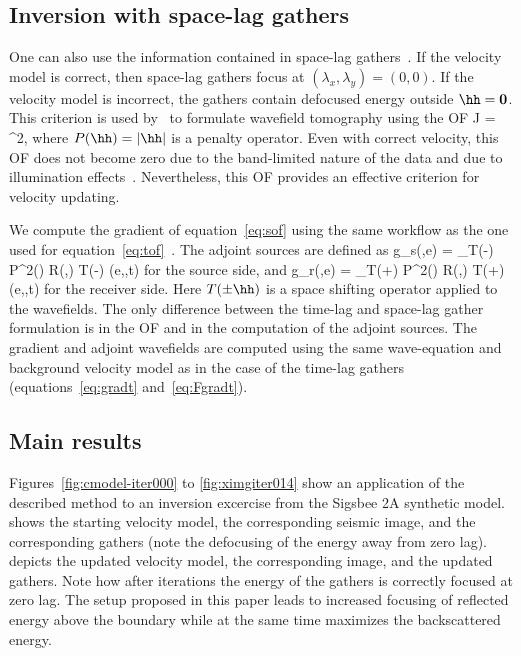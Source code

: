 \subsection{Inversion with space-lag gathers}
One can also use the information contained in space-lag 
gathers~\citep{rickett:883}. If the velocity model is correct, then space-lag
 gathers focus at $(\lambda_x,\lambda_y)=(0,0)$. If the velocity model is incorrect, the 
gathers contain defocused energy outside $\hh=\bf{0}$. This criterion is used
by~\cite{shen:VE49,Yang2011,Wiktor} to formulate wavefield tomography using
 the OF
\beq
J =  ^2,
\label{eq:sof}
\eeq
where $P(\hh)=|\hh|$ is a penalty operator. Even with correct velocity, this OF 
does not become zero due to the band-limited nature of the data and due to 
illumination effects~\citep{tony_seg:cwp12}. Nevertheless, this OF provides an
 effective criterion for velocity updating.

We compute the gradient of equation~\ref{eq:sof} using the same workflow as the 
one used for equation~\ref{eq:tof}~\citep{Yang2011}. The adjoint sources are 
defined as
\beq
g_s(\xx,{e}) = \sum_\hh  T(-\hh) P^2(\hh) R(\xx,\hh) T(-\hh) \UR({e},\xx,t)
\label{eq:gsx}
\eeq
for the source side, and
\beq
g_r(\xx,{e}) = \sum_\hh  T(+\hh) P^2(\hh) R(\xx,\hh) T(+\hh) \US({e},\xx,t)
\label{eq:gsx}
\eeq
for the receiver side. Here $T(\pm\hh)$ is a space shifting operator applied to
 the wavefields. The only difference between the time-lag and space-lag gather 
formulation is in the OF and in the computation of the adjoint sources. The 
gradient and adjoint wavefields are computed using the same wave-equation and 
background velocity model as in the case of the time-lag gathers 
(equations~\ref{eq:gradt} and~\ref{eq:Fgradt}).

\subsection{Main results}

Figures~\ref{fig:cmodel-iter000} to \ref{fig:ximgiter014} show an application of the described method
to an inversion excercise from the Sigsbee 2A synthetic model. 
shows the starting velocity model,  the corresponding seismic
image, and  the corresponding gathers (note the defocusing of 
the energy away from zero lag).  depicts the updated velocity 
model,  the corresponding image, and  the updated
gathers. Note how after iterations the energy of the gathers is correctly focused 
at zero lag. 
 The setup proposed in this paper leads to increased focusing
of reflected energy above the boundary while at the same time
maximizes the backscattered energy. 


